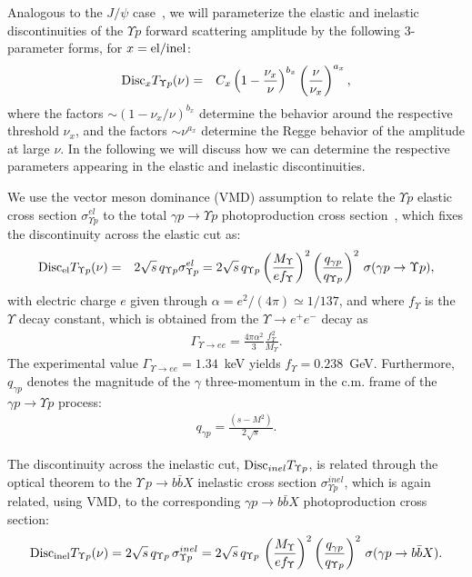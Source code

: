 \documentclass[10pt,prd,aps,nofootinbib,superscriptaddress]{revtex4}
\newcommand{\bea}{\begin{eqnarray}}
\newcommand{\eea}{\end{eqnarray}}
\begin{document}
Analogous to the $J/\psi$ case~\cite{Gryniuk:2016mpk}, 
we will parameterize the elastic and inelastic discontinuities of the $\Upsilon p$  forward scattering amplitude 
by the following 3-parameter forms, for $x = {\rm el/inel}$:
\bea
{\rm Disc}_{x} T_{\Upsilon p}(\nu)  &=& 
C_{x} \left( 1 - \frac{\nu_{x}}{\nu} \right)^{b_{x}}  \left( \frac{\nu}{\nu_{x}} \right)^{a_{x}} ,
\label{eq:discx} 
\eea
where the factors $\sim (1 - \nu_x / \nu)^{b_x}$  
determine the behavior around the respective threshold $\nu_x$, and the 
factors  $\sim \nu^{a_x}$ determine the Regge behavior of the amplitude at large $\nu$. 
In the following we will discuss how we can determine the respective parameters 
appearing in the elastic and inelastic discontinuities. 

We use the vector meson dominance (VMD) assumption to relate the $\Upsilon p$ elastic cross section 
$\sigma_{\Upsilon p}^{el}$ to the total $\gamma p \to \Upsilon p$ photoproduction cross section~\cite{Barger:1975ng,Redlich:2000cb}, which fixes the 
discontinuity across the elastic cut as: 
\bea
{\rm Disc}_{\rm el} T_{\Upsilon p}(\nu)  &=& 2 \sqrt{s} \, q_{\Upsilon p} \sigma_{\Upsilon p}^{el} 
=  2 \sqrt{s} \, q_{\Upsilon p}  \left( \frac{M_\Upsilon}{e f_\Upsilon} \right)^2 \left( \frac{q_{\gamma p}}{q_{\Upsilon p}} \right)^2 \, 
\sigma (\gamma p \to \Upsilon p), 
\label{eq:sigmael}
\eea
with electric charge $e$ given through $\alpha = e^2 / (4 \pi) \simeq 1/137$, and  where $f_\Upsilon$ is the $\Upsilon$ decay constant, which is obtained from the $\Upsilon \to e^+ e^-$ decay as 
\begin{eqnarray}
\Gamma_{\Upsilon \to ee} = \frac{4 \pi \alpha^2}{3} \frac{f_\Upsilon^2}{M_\Upsilon}.
\end{eqnarray}
The experimental value $\Gamma_{\Upsilon \to ee} =  1.34$~keV yields $f_\Upsilon = 0.238$~GeV. Furthermore, $q_{\gamma p}$ denotes the magnitude of the 
$\gamma$ three-momentum in the c.m. frame of the $\gamma p \to \Upsilon p$ process:
\bea
q_{\gamma p} = \frac{(s - M^2)}{2 \sqrt{s}}.
\eea

The discontinuity across the inelastic cut, ${\rm Disc}_{inel} T_{\Upsilon p}$, 
is related through the optical theorem to the $\Upsilon \, p \to b \bar b X$ inelastic cross section 
$\sigma_{\Upsilon p}^{inel}$, which is again related, using VMD, to the corresponding $\gamma p \to b \bar b X$ photoproduction cross section:
\bea
{\rm Disc}_{\rm inel} T_{\Upsilon p}(\nu) = 2 \sqrt{s} \, q_{\Upsilon p} \, \sigma_{\Upsilon p}^{inel}    
 = 2 \sqrt{s} \, q_{\Upsilon p} \,  \left( \frac{M_\Upsilon}{e f_\Upsilon} \right)^2  \left( \frac{q_{\gamma p}}{q_{\Upsilon p}} \right)^2 \,  \sigma (\gamma p \to b \bar b X). 
\label{eq:sigmainel}
\eea
\end{document}
